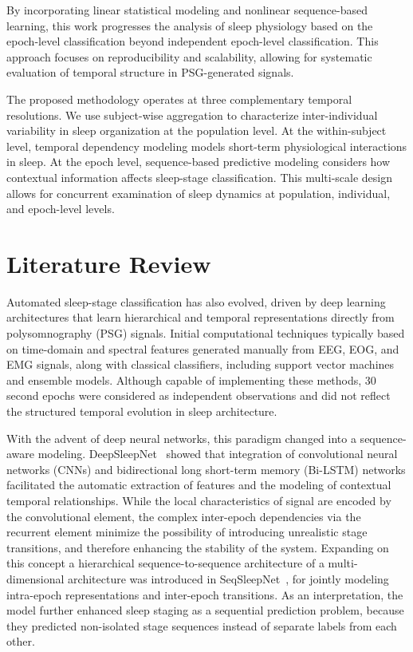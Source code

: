 \documentclass[10pt]{cai26}
\begin{document}
By incorporating linear statistical modeling and nonlinear sequence-based learning, this work progresses the analysis of sleep physiology based on the epoch-level 
classification beyond independent epoch-level classification. This approach focuses on reproducibility and scalability, allowing for systematic evaluation of temporal 
structure in PSG-generated signals.

The proposed methodology operates at three complementary temporal resolutions. We use subject-wise aggregation to characterize inter-individual variability in sleep 
organization at the population level. At the within-subject level, temporal dependency modeling models short-term physiological interactions in sleep. At the epoch level, 
sequence-based predictive modeling considers how contextual information affects sleep-stage classification. This multi-scale design allows for concurrent examination of 
sleep dynamics at population, individual, and epoch-level levels.

\section{Literature Review}
\label{literature}
Automated sleep-stage classification has also evolved, driven by deep learning architectures that learn hierarchical and temporal 
representations directly from polysomnography (PSG) signals. Initial computational techniques typically based on time-domain and 
spectral features generated manually from EEG, EOG, and EMG signals, along with classical classifiers, including support vector 
machines and ensemble models. Although capable of implementing these methods, 30 second epochs were considered as independent 
observations and did not reflect the structured temporal evolution in sleep architecture. 

With the advent of deep neural networks, this paradigm changed into a sequence-aware modeling. DeepSleepNet~\cite{Supratak2017} showed that 
integration of convolutional neural networks (CNNs) and bidirectional long short-term memory (Bi-LSTM) networks facilitated the 
automatic extraction of features and the modeling of contextual temporal relationships. While the local characteristics of signal 
are encoded by the convolutional element, the complex inter-epoch dependencies via the recurrent element minimize the possibility 
of introducing unrealistic stage transitions, and therefore enhancing the stability of the system. Expanding on this concept a 
hierarchical sequence-to-sequence architecture of a multi-dimensional architecture was introduced in SeqSleepNet~\cite{Phan2019}, for 
jointly modeling intra-epoch representations and inter-epoch transitions. As an interpretation, the model further enhanced sleep 
staging as a sequential prediction problem, because they predicted non-isolated stage sequences instead of separate labels from 
each other. 
\end{document}
